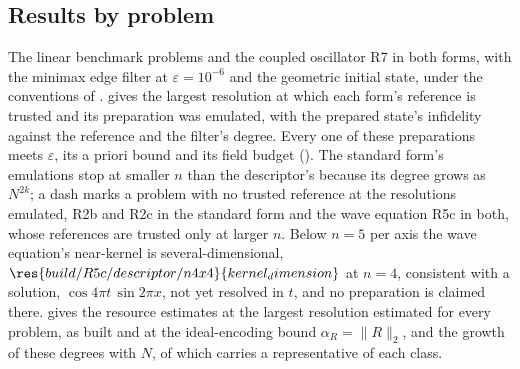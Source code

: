 \subsection{Results by problem}
\label{app:catalogue-results}

The linear benchmark problems and the coupled oscillator R7 in both forms, with the minimax edge filter at $\varepsilon=10^{-6}$ and the geometric initial state, under the conventions of .  gives the largest resolution at which each form's reference is trusted and its preparation was emulated, with the prepared state's infidelity against the reference and the filter's degree. Every one of these preparations meets $\varepsilon$, its a priori bound and its field budget (). The standard form's emulations stop at smaller $n$ than the descriptor's because its degree grows as $N^{2k}$; a dash marks a problem with no trusted reference at the resolutions emulated, R2b and R2c in the standard form and the wave equation R5c in both, whose references are trusted only at larger $n$. Below $n=5$ per axis the wave equation's near-kernel is several-dimensional, $\res{build/R5c/descriptor/n4x4}{kernel_dimension}$ at $n=4$, consistent with a solution, $\cos4\pi t\,\sin2\pi x$, not yet resolved in $t$, and no preparation is claimed there.  gives the resource estimates at the largest resolution estimated for every problem, as built and at the ideal-encoding bound $\alpha_R=\|R\|_2$, and  the growth of these degrees with $N$, of which  carries a representative of each class.


